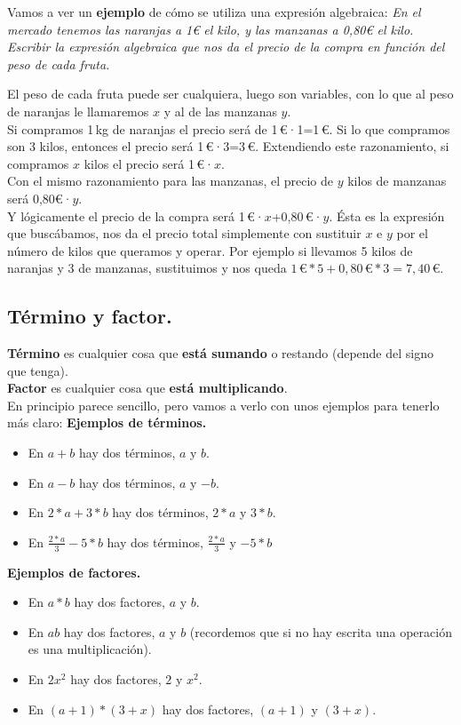 \documentclass[a4paper,11pt,answers]{exam}
\begin{document}
  Vamos a ver un \textbf{ejemplo} de cómo se utiliza una expresión algebraica:
  \emph{En el mercado tenemos las naranjas a 1€ el kilo, y las manzanas a 0,80€ el kilo. Escribir la expresión algebraica que nos da el precio de la compra en función del peso de cada fruta.}
  \begin{solution}
    El peso de cada fruta puede ser cualquiera, luego son variables, con lo que al peso de naranjas le llamaremos $x$ y al de las manzanas $y$.\\

    Si compramos 1\,kg de naranjas el precio será de 1\,€·1=1\,€. Si lo que compramos son 3 kilos, entonces el precio será 1\,€·3=3\,€. Extendiendo este razonamiento, si compramos $x$ kilos el precio será 1\,€·$x$.\\
    Con el mismo razonamiento para las manzanas, el precio de $y$ kilos de manzanas será 0,80€·$y$.\\

    Y lógicamente el precio de la compra será 1\,€·$x$+0,80\,€·$y$. Ésta es la expresión que buscábamos, nos da el precio total simplemente con sustituir $x$ e $y$ por el número de kilos que queramos y operar. Por ejemplo si llevamos 5 kilos de naranjas y 3 de manzanas, sustituimos y nos queda $1\,\text{€}*5+0,80\,\text{€}*3=7,40\,\text{€}$.
  \end{solution}
  \subsection{Término y factor.}
  \textbf{Término} es cualquier cosa que \textbf{está  sumando} o restando (depende del signo que tenga).\\

  \textbf{Factor} es cualquier cosa que \textbf{está multiplicando}.\\

  En principio parece sencillo, pero vamos a verlo con unos ejemplos para tenerlo más claro:
  \textbf{Ejemplos de términos.}
  \begin{itemize}
  \item En $a+b$ hay dos términos, $a$ y $b$.
  \item En $a-b$ hay dos términos, $a$ y $-b$.
  \item En $2*a + 3*b$ hay dos términos, $2*a$ y $3*b$.
  \item En $\frac{2*a}{3} - 5*b$ hay dos términos, $\frac{2*a}{3}$ y $-5*b$
  \end{itemize}
  \textbf{Ejemplos de factores.}
  \begin{itemize}
  \item En $a*b$ hay dos factores, $a$ y $b$.
  \item En $ab$ hay dos factores, $a$ y $b$ (recordemos que si no hay escrita una operación es una multiplicación).
  \item En $2x^2$ hay dos factores, $2$ y $x^2$.
  \item En $(a+1)*(3+x)$ hay dos factores, $(a+1)$ y $(3+x)$.
  \end{itemize}
\end{document}
